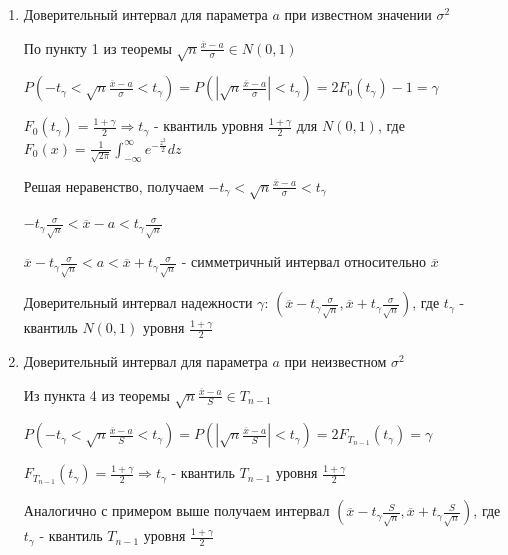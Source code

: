 \documentclass[12pt]{article}
\begin{document}
\begin{enumerate}[label*=\Roman*.]
    \hypertarget{confidence_interval_for_a_known_sigma}{}

    \item Доверительный интервал для параметра $a$ при известном значении $\sigma^2$

    По пункту 1 из теоремы $\sqrt{n} \frac{\overline{x} - a}{\sigma} \in N(0, 1)$ 

    $P\left(-t_\gamma < \sqrt{n} \frac{\overline{x} - a}{\sigma} < t_\gamma\right) = 
    P\left(\left|\sqrt{n} \frac{\overline{x} - a}{\sigma}\right| < t_\gamma\right) = 2F_0 (t_\gamma) - 1 = \gamma$

    $F_0(t_\gamma) = \frac{1 + \gamma}{2} \Longrightarrow t_\gamma$ - квантиль уровня 
    $\frac{1 + \gamma}{2}$ для $N(0, 1)$, где
    $F_0(x) = \frac{1}{\sqrt{2\pi}} \int_{-\infty}^{\infty} e^{-\frac{z^2}{2}} dz$

    Решая неравенство, получаем $-t_\gamma < \sqrt{n} \frac{\overline{x} - a}{\sigma} < t_\gamma$

    $-t_\gamma \frac{\sigma}{\sqrt{n}} < \overline{x} - a < t_\gamma \frac{\sigma}{\sqrt{n}}$

    $\overline{x} - t_\gamma \frac{\sigma}{\sqrt{n}} < a < \overline{x} + t_\gamma \frac{\sigma}{\sqrt{n}}$ - 
    симметричный интервал относительно $\overline{x}$

    Доверительный интервал надежности $\gamma$: $\left(\overline{x} - t_\gamma \frac{\sigma}{\sqrt{n}}, 
    \overline{x} + t_\gamma \frac{\sigma}{\sqrt{n}}\right)$, 
    где $t_\gamma$ - квантиль $N(0, 1)$ уровня $\frac{1 + \gamma}{2}$

    \hypertarget{confidence_interval_for_a_unknown_sigma}{}

    \item Доверительный интервал для параметра $a$ при неизвестном $\sigma^2$

    Из пункта 4 из теоремы $\sqrt{n} \frac{\overline{x} - a}{S} \in T_{n - 1}$

    $P\left(-t_\gamma < \sqrt{n} \frac{\overline{x} - a}{S} < t_\gamma\right) = P\left(\left|\sqrt{n} \frac{\overline{x} - a}{S}\right| < t_\gamma\right) = 2F_{T_{n - 1}}(t_\gamma) = \gamma$

    $F_{T_{n - 1}}(t_\gamma) = \frac{1 + \gamma}{2} \Longrightarrow t_\gamma$ - квантиль $T_{n - 1}$ уровня 
    $\frac{1 + \gamma}{2}$

    Аналогично с примером выше получаем интервал $\left(\overline{x} - t_\gamma \frac{S}{\sqrt{n}}, 
    \overline{x} + t_\gamma \frac{S}{\sqrt{n}}\right)$, 
    где $t_\gamma$ - квантиль $T_{n - 1}$ уровня $\frac{1 + \gamma}{2}$


\end{enumerate}
\end{document}
